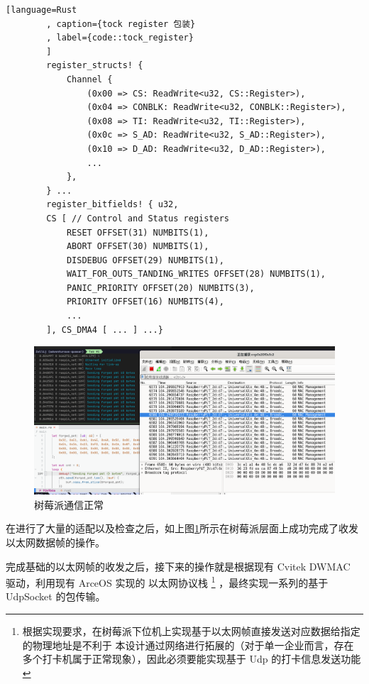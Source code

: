     \begin{lstlisting}[language=Rust
        , caption={tock register 包装}
        , label={code::tock_register}
        ]
        register_structs! {
            Channel {
                (0x00 => CS: ReadWrite<u32, CS::Register>),
                (0x04 => CONBLK: ReadWrite<u32, CONBLK::Register>),
                (0x08 => TI: ReadWrite<u32, TI::Register>),
                (0x0c => S_AD: ReadWrite<u32, S_AD::Register>),
                (0x10 => D_AD: ReadWrite<u32, D_AD::Register>),
                ...
            },
        } ...
        register_bitfields! { u32,
        CS [ // Control and Status registers
            RESET OFFSET(31) NUMBITS(1),
            ABORT OFFSET(30) NUMBITS(1),
            DISDEBUG OFFSET(29) NUMBITS(1),
            WAIT_FOR_OUTS_TANDING_WRITES OFFSET(28) NUMBITS(1),
            PANIC_PRIORITY OFFSET(20) NUMBITS(3),
            PRIORITY OFFSET(16) NUMBITS(4),
            ...
        ], CS_DMA4 [ ... ] ...}
    \end{lstlisting}

    \begin{figure}[ht]
        \centering
        \includegraphics[scale=0.3]{./imgs/树莓派通信正常.jpg}
        \caption{树莓派通信正常}    \label{fig::树莓派通信正常}
    \end{figure}

    在进行了大量的适配以及检查之后，如上图\ref{fig::树莓派通信正常}所示在树莓派层面上成功完成了收发以太网数据帧的操作。
            
    完成基础的以太网帧的收发之后，接下来的操作就是根据现有 Cvitek DWMAC 驱动，利用现有 ArceOS 实现的
    以太网协议栈
    \footnote{根据实现要求，在树莓派下位机上实现基于以太网帧直接发送对应数据给指定的物理地址是不利于
    本设计通过网络进行拓展的（对于单一企业而言，存在多个打卡机属于正常现象），因此必须要能实现基于 Udp 的打卡信息发送功能}
    ，最终实现一系列的基于 UdpSocket 的包传输。

